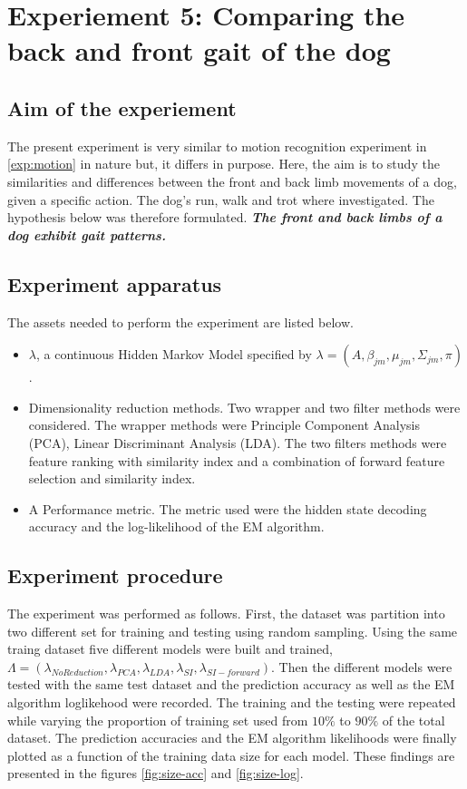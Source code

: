 \section{Experiement 5: Comparing the back and front gait of the dog}  \label{exp:front-back}

\subsection{Aim of the experiement}
The present experiment is very similar to motion recognition experiment in \ref{exp:motion} in nature but, it differs in purpose. Here, the aim is to study the similarities and differences between the front and back limb movements of a dog, given a specific action. The dog's run, walk and trot where investigated.
The hypothesis below was therefore formulated.
\textbf{\textit{The front and back limbs of a dog exhibit gait patterns.}}

\subsection{Experiment apparatus}
The assets needed to perform the experiment are listed below.
\begin{itemize}
	\item \(\lambda\), a continuous Hidden Markov Model specified by \(\lambda = (A, \beta_{jm}, \mu_{jm}, \Sigma_{jm}, \pi)\).
	\item Dimensionality reduction methods. Two wrapper and two filter methods were considered. The wrapper methods were Principle Component Analysis (PCA), Linear Discriminant Analysis (LDA). The two filters methods were feature ranking with similarity index %
	and a combination of forward feature selection and similarity index.
	\item A Performance metric. The metric used were the hidden state decoding accuracy and the log-likelihood of the EM algorithm.
\end{itemize}

\subsection{Experiment procedure}
The experiment was performed as follows.
First, the dataset was partition into two different set for training and testing using random sampling.
Using the same traing dataset five different models were built and trained, \(\Lambda = (\lambda_{No Reduction}, \lambda_{PCA}, \lambda_{LDA}, \lambda_{SI}, \lambda_{SI-forward})\).
Then the different models were tested with the same test dataset and the prediction accuracy as well as the EM algorithm loglikehood were recorded.
The training and the testing were repeated while varying the proportion of training set used from \(10\%\) to \(90\%\) of the total dataset.
The prediction accuracies and the EM algorithm likelihoods were finally plotted as a function of the training data size for each model.
These findings are presented in the figures \ref{fig:size-acc} and \ref{fig:size-log}. 

